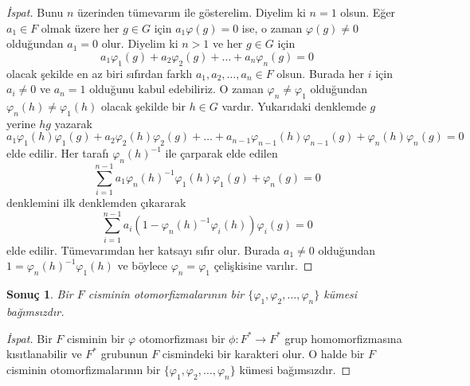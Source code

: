 \documentclass[draft]{article}
\newtheorem{cor}[thm]{Sonuç}
\theoremstyle{definition}
\theoremstyle{remark}
\begin{document}
    		\begin{proof}[İspat]
    	        Bunu $n$ üzerinden tümevarım ile gösterelim. Diyelim ki $n = 1$ olsun. Eğer $a_1 \in F$ olmak üzere her $g \in G$ için $a_1\varphi(g) = 0$ ise, o zaman $\varphi(g) \neq 0$ olduğundan $a_1 = 0$ olur. Diyelim ki $n > 1$ ve her $g \in G$ için
    	        \begin{equation*}
    	            a_1\varphi_1(g) + a_2\varphi_2(g) + \dots + a_n\varphi_n(g) = 0
    	        \end{equation*}
    	        olacak şekilde en az biri sıfırdan farklı $a_1, a_2, \dots, a_n \in F$ olsun. Burada her $i$ için $a_i \neq 0$ ve $a_n = 1$ olduğunu kabul edebiliriz. O zaman $\varphi_n \neq \varphi_1$ olduğundan $\varphi_n(h) \neq \varphi_1(h)$ olacak şekilde bir $h \in G$ vardır. Yukarıdaki denklemde $g$ yerine $hg$ yazarak
    	        \begin{equation*}
    	            a_1\varphi_1(h)\varphi_1(g) + a_2\varphi_2(h)\varphi_2(g) + \dots + a_{n - 1}\varphi_{n - 1}(h)\varphi_{n - 1}(g) + \varphi_n(h)\varphi_n(g) = 0
    	        \end{equation*}
    	        elde edilir. Her tarafı $\varphi_n(h)^{-1}$ ile çarparak elde edilen
    	        \begin{equation*}
    	            \sum_{i = 1}^{n - 1}{a_1\varphi_n(h)^{-1}\varphi_1(h)\varphi_1(g)} + \varphi_n(g)= 0
    	        \end{equation*}
    	        denklemini ilk denklemden çıkararak
    	        \begin{equation*}
    	            \sum_{i = 1}^{n - 1}{a_i(1 - \varphi_n(h)^{-1}\varphi_i(h))\varphi_i(g)} = 0
    	        \end{equation*}
    	        elde edilir. Tümevarımdan her katsayı sıfır olur. Burada $a_1 \neq 0$ olduğundan $1 = \varphi_n(h)^{-1}\varphi_1(h)$ ve böylece $\varphi_n = \varphi_1$ çelişkisine varılır.
    	    \end{proof}
    		
    		\begin{cor}
    		    Bir $F$ cisminin otomorfizmalarının bir $\{\varphi_1, \varphi_2, \dots, \varphi_n\}$ kümesi bağımsızdır.
    		\end{cor}
    		
    		\begin{proof}[İspat]
    	        Bir $F$ cisminin bir $\varphi$ otomorfizması bir $\phi: F^* \to F^*$ grup homomorfizmasına kısıtlanabilir ve $F^*$ grubunun $F$ cismindeki bir karakteri olur. O halde bir $F$ cisminin otomorfizmalarının bir $\{\varphi_1, \varphi_2, \dots, \varphi_n\}$ kümesi bağımsızdır.
    	    \end{proof}
    	    
\end{document}
